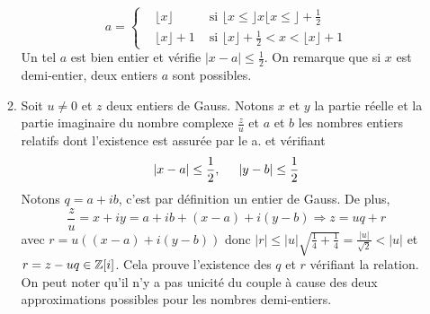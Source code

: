 \begin{enumerate}
\begin{enumerate}
\begin{displaymath}
  a=
\left\lbrace 
\begin{aligned}
  &\lfloor x \rfloor    &\text{ si } \lfloor x \leq \rfloor x \lfloor x \leq \rfloor + \frac{1}{2} \\
  &\lfloor x \rfloor +1 &\text{ si } \lfloor x \rfloor + \frac{1}{2} < x < \lfloor x \rfloor +1 
\end{aligned}
\right. 
\end{displaymath}
Un tel $a$ est bien entier et vérifie $|x-a|\leq \frac{1}{2}$. On remarque que si $x$ est demi-entier, deux entiers $a$ sont possibles.
  \item Soit $u\neq0$ et $z$ deux entiers de Gauss. Notons $x$ et $y$ la partie réelle et la partie imaginaire du nombre complexe $\frac{z}{u}$ et $a$ et $b$ les nombres entiers relatifs dont l'existence est assurée par le a. et vérifiant 
\begin{displaymath}
  |x-a|\leq \frac{1}{2},\hspace{0.5cm} |y-b|\leq \frac{1}{2}
\end{displaymath}
Notons $q=a+ib$, c'est par définition un entier de Gauss. De plus,
\begin{displaymath}
\frac{z}{u} = x + iy = a+ib + (x-a) + i(y-b) 
\Rightarrow
z = uq + r  
\end{displaymath}
avec $r= u((x-a) + i(y-b))$ donc $|r|\leq|u|\sqrt{\frac{1}{4}+\frac{1}{4}}=\frac{|u|}{\sqrt{2}}<|u|$ et $r = z - uq \in \mathbb{Z}[i]$.
Cela prouve l'existence des $q$ et $r$ vérifiant la relation. On peut noter qu'il n'y a pas unicité du couple à cause des deux approximations possibles pour les nombres demi-entiers.
\end{enumerate}
\end{enumerate}

